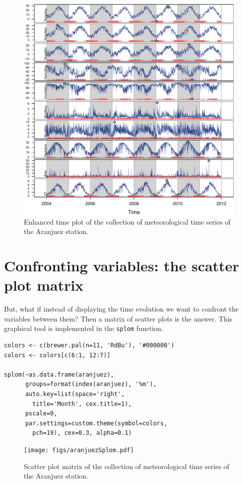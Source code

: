 \begin{figure}[htb]
\centering
\includegraphics[width=.9\linewidth]{figs/aranjuezXblocks.pdf}
\caption{\label{fig:aranjuezEnhanced}Enhanced time plot of the collection of meteorological time series of the Aranjuez station.}
\end{figure}
\section{Confronting variables: the scatter plot matrix}
\label{sec-2}


But, what if instead of displaying the time evolution we want to
confront the variables between them? Then a matrix of scatter
plots is the answer. This graphical tool is implemented in the
\texttt{splom} function. 


\lstset{language=R}
\begin{lstlisting}
colors <- c(brewer.pal(n=11, 'RdBu'), '#000000')
colors <- colors[c(6:1, 12:7)]

splom(~as.data.frame(aranjuez),
      groups=format(index(aranjuez), '%m'),
      auto.key=list(space='right', 
        title='Month', cex.title=1),
      pscale=0,
      par.settings=custom.theme(symbol=colors,
        pch=19), cex=0.3, alpha=0.1)
\end{lstlisting}

\begin{figure}[htb]
\centering
\texttt{[image: figs/aranjuezSplom.pdf]}
\caption{\label{fig:aranjuezSplomNaive}Scatter plot matrix of the collection of meteorological time series of the Aranjuez station.}
\end{figure}

